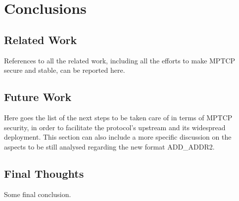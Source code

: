 \chapter{Conclusions}
\label{chap:conclusions}

\section{Related Work}
References to all the related work, including all the efforts to make MPTCP secure and stable, can be reported here.

\section{Future Work}
Here goes the list of the next steps to be taken care of in terms of MPTCP security, in order to facilitate the protocol's upstream and its widespread deployment. This section can also include a more specific discussion on the aspects to be still analysed regarding the new format ADD\_ADDR2.

\section{Final Thoughts}
Some final conclusion.